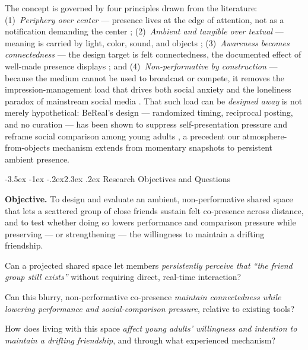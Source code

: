 \documentclass[11pt]{article}
\makeatletter
\renewcommand\section{\@startsection{section}{1}{\z@}%
  {-3.5ex \@plus -1ex \@minus -.2ex}{2.3ex \@plus .2ex}%
  {\normalfont\Large\bfseries\color{accent}}}
\makeatother
\begin{document}
The concept is governed by four principles drawn from the literature:
(1)~\emph{Periphery over center} --- presence lives at the edge of attention, not
as a notification demanding the center \citep{weiserbrown1996};
(2)~\emph{Ambient and tangible over textual} --- meaning is carried by light,
color, sound, and objects \citep{ishiiullmer1997};
(3)~\emph{Awareness becomes connectedness} --- the design target is felt
connectedness, the documented effect of well-made presence displays
\citep{deyguzman2006, markopoulos2004}; and
(4)~\emph{Non-performative by construction} --- because the medium cannot be used
to broadcast or compete, it removes the impression-management load that drives
both social anxiety \citep{high2009, stritzke2004} and the loneliness paradox of
mainstream social media \citep{robertsyoungdavid2025}. That such load can be
\emph{designed away} is not merely hypothetical: BeReal's design --- randomized
timing, reciprocal posting, and no curation --- has been shown to suppress
self-presentation pressure and reframe social comparison among young adults
\citep{kim2024bereal}, a precedent our atmosphere-from-objects mechanism extends
from momentary snapshots to persistent ambient presence.

\section{Research Objectives and Questions}

\noindent\textbf{Objective.} To design and evaluate an ambient, non-performative
shared space that lets a scattered group of close friends sustain felt
co-presence across distance, and to test whether doing so lowers performance and
comparison pressure while preserving --- or strengthening --- the willingness to
maintain a drifting friendship.

\begin{description}[leftmargin=1.4em, style=nextline]
\item[RQ1 (Foundation).] Can a projected shared space let members
\emph{persistently perceive that ``the friend group still exists''} without
requiring direct, real-time interaction?
\item[RQ2 (Core).] Can this blurry, non-performative co-presence \emph{maintain
connectedness while lowering performance and social-comparison pressure}, relative
to existing tools?
\item[RQ3 (Real world).] How does living with this space \emph{affect young
adults' willingness and intention to maintain a drifting friendship}, and through
what experienced mechanism?
\end{description}
\end{document}
